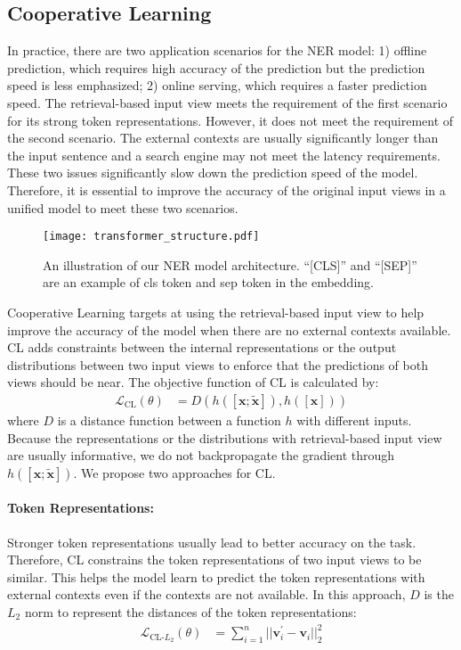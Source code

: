 \documentclass[11pt,a4paper]{article}
\def\vv{{\bm{v}}}
\def\vx{{\bm{x}}}
\newcommand{\mcL}{\mathcal{L}}
\begin{document}
\subsection{Cooperative Learning}
In practice, there are two application scenarios for the NER model: 1) offline prediction, which requires high accuracy of the prediction but the prediction speed is less emphasized; 2) online serving, which requires a faster prediction speed. The retrieval-based input view meets the requirement of the first scenario for its strong token representations. However, it does not meet the requirement of the second scenario. The external contexts are usually significantly longer than the input sentence and a search engine may not meet the latency requirements. These two issues significantly slow down the prediction speed of the model. Therefore, it is essential to improve the accuracy of the original input views in a unified model to meet these two scenarios.



\begin{figure}[t]
	\centering
	\texttt{[image: transformer\_structure.pdf]}
	\caption{An illustration of our NER model architecture. ``[CLS]'' and ``[SEP]'' are an example of cls token and sep token in the embedding. }
	\label{fig:ner}
\end{figure}


Cooperative Learning targets at using the retrieval-based input view to help improve the accuracy of the model when there are no external contexts available. CL adds constraints between the internal representations or the output distributions between two input views to enforce that the predictions of both views should be near. The objective function of CL is calculated by:
\begin{align}
\mcL_{\text{CL}}(\theta)&=D(h([\vx;\tilde{\vx}]), h([\vx])) \label{eq:cl_loss}
\end{align}
where $D$ is a distance function between a function $h$ with different inputs. Because the representations or the distributions with retrieval-based input view are usually informative, we do not backpropagate the gradient through $h([\vx;\tilde{\vx}])$. We propose two approaches for CL.

\paragraph{Token Representations:} Stronger token representations usually lead to better accuracy on the task. Therefore, CL constrains the token representations of two input views to be similar. This helps the model learn to predict the token representations with external contexts even if the contexts are not available. In this approach, $D$ is the $L_2$ norm to represent the distances of the token representations:
\begin{align}
\mcL_{\text{CL-$L_2$}}(\theta)&=\sum_{i=1}^n||\vv_{i}^{\prime}-\vv_{i}||_2^2 \label{eq:L2_loss}
\end{align}
\end{document}
